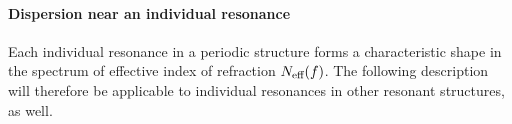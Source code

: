 \begin{figure}[h!]
\begin{tabular}{r}
\end{tabular}
\end{figure}
\paragraph{Dispersion near an individual resonance}%
Each individual resonance in a periodic structure forms a characteristic shape in the spectrum of effective index of refraction $N_{\text{eff} }(f)$. The following description will therefore be applicable to individual resonances in other resonant structures, as well. 

